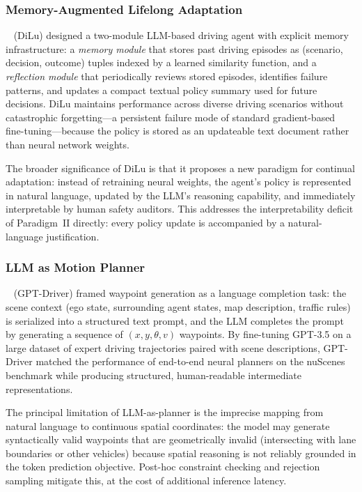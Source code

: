 \documentclass[12pt, a4paper]{article}
\begin{document}
\subsubsection{Memory-Augmented Lifelong Adaptation}

\citeauthor{wen2023dilu}~\cite{wen2023dilu} (DiLu) designed a two-module
LLM-based driving agent with explicit memory infrastructure: a
\emph{memory module} that stores past driving episodes as (scenario, decision,
outcome) tuples indexed by a learned similarity function, and a
\emph{reflection module} that periodically reviews stored episodes, identifies
failure patterns, and updates a compact textual policy summary used for future
decisions.  DiLu maintains performance across diverse driving scenarios without
catastrophic forgetting---a persistent failure mode of standard gradient-based
fine-tuning---because the policy is stored as an updateable text document
rather than neural network weights.

The broader significance of DiLu is that it proposes a new paradigm for
continual adaptation: instead of retraining neural weights, the agent's
policy is represented in natural language, updated by the LLM's reasoning
capability, and immediately interpretable by human safety auditors.  This
addresses the interpretability deficit of Paradigm~II directly: every policy
update is accompanied by a natural-language justification.

\subsubsection{LLM as Motion Planner}

\citeauthor{mao2023gpt}~\cite{mao2023gpt} (GPT-Driver) framed waypoint
generation as a language completion task: the scene context (ego state,
surrounding agent states, map description, traffic rules) is serialized
into a structured text prompt, and the LLM completes the prompt by generating
a sequence of $(x, y, \theta, v)$ waypoints.  By fine-tuning GPT-3.5 on
a large dataset of expert driving trajectories paired with scene descriptions,
GPT-Driver matched the performance of end-to-end neural planners on the
nuScenes benchmark while producing structured, human-readable intermediate
representations.

The principal limitation of LLM-as-planner is the imprecise mapping from
natural language to continuous spatial coordinates: the model may generate
syntactically valid waypoints that are geometrically invalid (intersecting
with lane boundaries or other vehicles) because spatial reasoning is not
reliably grounded in the token prediction objective.  Post-hoc constraint
checking and rejection sampling mitigate this, at the cost of additional
inference latency.
\end{document}
